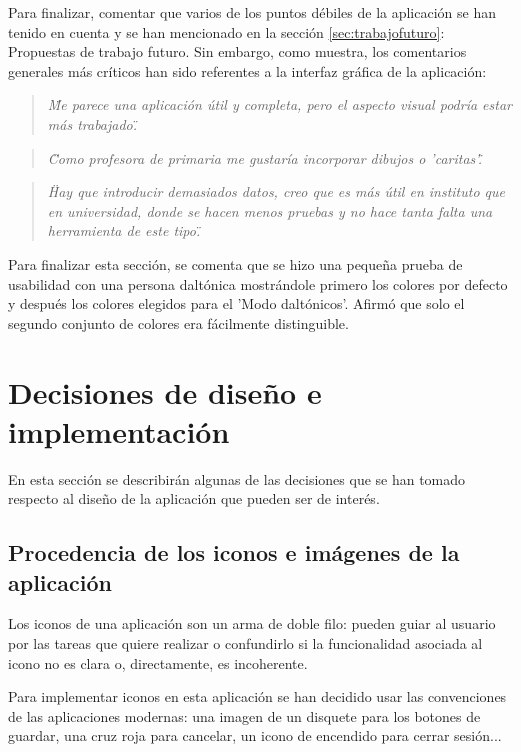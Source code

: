 Para finalizar, comentar que varios de los puntos débiles de la aplicación se han tenido en cuenta y se han mencionado en la sección \ref{sec:trabajofuturo}: Propuestas de trabajo futuro. Sin embargo, como muestra, los comentarios generales más críticos han sido referentes a la interfaz gráfica de la aplicación:

\begin{quote}
\textit{\"Me parece una aplicación útil y completa, pero el aspecto visual podría estar más trabajado.\"}
\end{quote}

\begin{quote}
\textit{\"Como profesora de primaria me gustaría incorporar dibujos o 'caritas'\".}
\end{quote}

\begin{quote}
\textit{\"Hay que introducir demasiados datos, creo que es más útil en instituto que en universidad, donde se hacen menos pruebas y no hace tanta falta una herramienta de este tipo.\"}
\end{quote}

Para finalizar esta sección, se comenta que se hizo una pequeña prueba de usabilidad con una persona daltónica mostrándole primero los colores por defecto y después los colores elegidos para el 'Modo daltónicos'. Afirmó que solo el segundo conjunto de colores era fácilmente distinguible.

\section{Decisiones de diseño e implementación}
En esta sección se describirán algunas de las decisiones que se han tomado respecto al diseño de la aplicación que pueden ser de interés.

\subsection{Procedencia de los iconos e imágenes de la aplicación}
Los iconos de una aplicación son un arma de doble filo: pueden guiar al usuario por las tareas que quiere realizar o confundirlo si la funcionalidad asociada al icono no es clara o, directamente, es incoherente.

Para implementar iconos en esta aplicación se han decidido usar las convenciones de las aplicaciones modernas: una imagen de un disquete para los botones de guardar, una cruz roja para cancelar, un icono de encendido para cerrar sesión...

